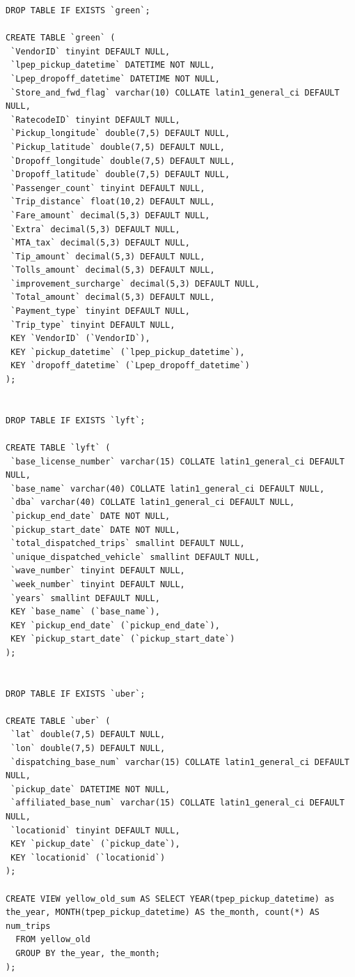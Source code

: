 \documentclass[12pt,twoside]{reedthesis}
\theoremstyle{definition}
\theoremstyle{definition}
\theoremstyle{definition}
\theoremstyle{remark}
\begin{document}
\begin{verbatim}
DROP TABLE IF EXISTS `green`;

CREATE TABLE `green` (
 `VendorID` tinyint DEFAULT NULL,
 `lpep_pickup_datetime` DATETIME NOT NULL,
 `Lpep_dropoff_datetime` DATETIME NOT NULL,
 `Store_and_fwd_flag` varchar(10) COLLATE latin1_general_ci DEFAULT NULL,
 `RatecodeID` tinyint DEFAULT NULL,
 `Pickup_longitude` double(7,5) DEFAULT NULL,
 `Pickup_latitude` double(7,5) DEFAULT NULL,
 `Dropoff_longitude` double(7,5) DEFAULT NULL,
 `Dropoff_latitude` double(7,5) DEFAULT NULL,
 `Passenger_count` tinyint DEFAULT NULL,
 `Trip_distance` float(10,2) DEFAULT NULL,
 `Fare_amount` decimal(5,3) DEFAULT NULL,
 `Extra` decimal(5,3) DEFAULT NULL,
 `MTA_tax` decimal(5,3) DEFAULT NULL,
 `Tip_amount` decimal(5,3) DEFAULT NULL,
 `Tolls_amount` decimal(5,3) DEFAULT NULL,
 `improvement_surcharge` decimal(5,3) DEFAULT NULL,
 `Total_amount` decimal(5,3) DEFAULT NULL,
 `Payment_type` tinyint DEFAULT NULL,
 `Trip_type` tinyint DEFAULT NULL,
 KEY `VendorID` (`VendorID`),
 KEY `pickup_datetime` (`lpep_pickup_datetime`),
 KEY `dropoff_datetime` (`Lpep_dropoff_datetime`)
);


DROP TABLE IF EXISTS `lyft`;

CREATE TABLE `lyft` (
 `base_license_number` varchar(15) COLLATE latin1_general_ci DEFAULT NULL,
 `base_name` varchar(40) COLLATE latin1_general_ci DEFAULT NULL,
 `dba` varchar(40) COLLATE latin1_general_ci DEFAULT NULL,
 `pickup_end_date` DATE NOT NULL,
 `pickup_start_date` DATE NOT NULL,
 `total_dispatched_trips` smallint DEFAULT NULL,
 `unique_dispatched_vehicle` smallint DEFAULT NULL,
 `wave_number` tinyint DEFAULT NULL,
 `week_number` tinyint DEFAULT NULL,
 `years` smallint DEFAULT NULL,
 KEY `base_name` (`base_name`),
 KEY `pickup_end_date` (`pickup_end_date`),
 KEY `pickup_start_date` (`pickup_start_date`)
);


DROP TABLE IF EXISTS `uber`;

CREATE TABLE `uber` (
 `lat` double(7,5) DEFAULT NULL,
 `lon` double(7,5) DEFAULT NULL,
 `dispatching_base_num` varchar(15) COLLATE latin1_general_ci DEFAULT NULL,
 `pickup_date` DATETIME NOT NULL,
 `affiliated_base_num` varchar(15) COLLATE latin1_general_ci DEFAULT NULL,
 `locationid` tinyint DEFAULT NULL,
 KEY `pickup_date` (`pickup_date`),
 KEY `locationid` (`locationid`)
);

CREATE VIEW yellow_old_sum AS SELECT YEAR(tpep_pickup_datetime) as the_year, MONTH(tpep_pickup_datetime) AS the_month, count(*) AS num_trips
  FROM yellow_old
  GROUP BY the_year, the_month; 
); 
\end{verbatim}
\end{document}
